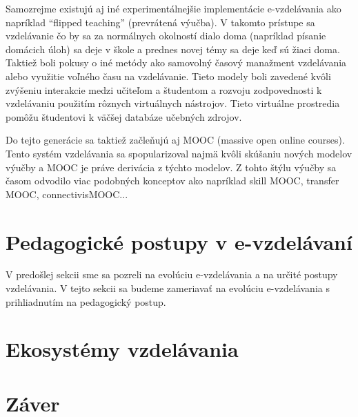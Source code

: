 \documentclass[10pt,slovak,a4paper]{article}
\begin{document}
	Samozrejme existujú aj iné experimentálnejšie implementácie e-vzdelávania ako napríklad “flipped teaching” (prevrátená výučba). V takomto prístupe sa vzdelávanie čo by sa za normálnych okolností dialo doma (napríklad písanie domácich úloh) sa deje v škole a prednes novej témy sa deje keď sú žiaci doma. Taktiež boli pokusy o iné metódy ako samovolný časový manažment vzdelávania alebo využitie voľného času na vzdelávanie. Tieto modely boli zavedené kvôli zvýšeniu interakcie medzi učiteľom a študentom a rozvoju zodpovednosti k vzdelávaniu použitím rôznych virtuálnych nástrojov. Tieto virtuálne prostredia pomôžu študentovi k väčšej databáze učebných zdrojov.

	Do tejto generácie sa taktiež začleňujú aj MOOC (massive open online courses). Tento systém vzdelávania sa spopularizoval najmä kvôli skúšaniu nových modelov výučby a MOOC je práve derivácia z týchto modelov. Z tohto štýlu výučby sa časom odvodilo viac podobných konceptov ako napríklad skill MOOC, transfer MOOC, connectivisMOOC...

\section{Pedagogické postupy v e-vzdelávaní} \label{pedagogicalApproaches}
	V predošlej sekcii sme sa pozreli na evolúciu e-vzdelávania a na určité postupy vzdelávania. V tejto sekcii sa budeme zameriavať na evolúciu e-vzdelávania s prihliadnutím na pedagogický postup.

\section{Ekosystémy vzdelávania} \label{ecosystems}



\section{Záver} \label{zaver} 
\newpage

\end{document}
